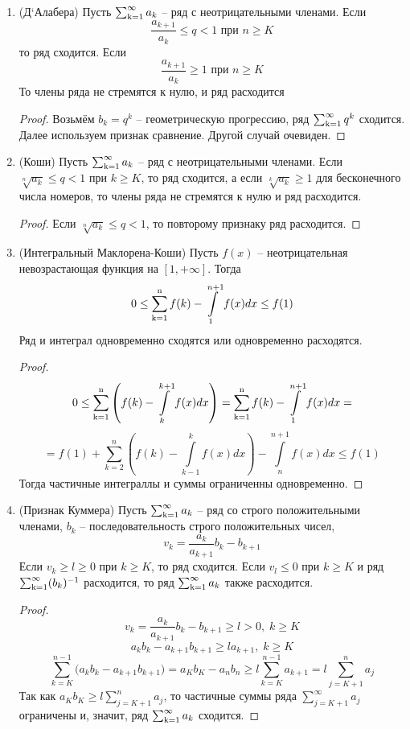 \begin{enumerate}
\begin{proof}
Значит, $a_n \le \frac{a_K}{b_K}b_n, n>K$, поэтому из сходимости ряда $\ssum b_k$ следует сходимость ряда $\ssum a_k$
\end{proof}
\item
(Д`Алабера) Пусть $\ssum a_k$ -- ряд с неотрицательными членами. Если
$$\frac{a_{k+1}}{a_k} \le q < 1 \text{ при } n\ge K$$
то ряд сходится. Если
$$ \frac{a_{k+1}}{a_k} \ge 1 \text{ при } n \ge K$$
То члены ряда не стремятся к нулю, и ряд расходится
\begin{proof}
Возьмём $b_k = q^k$ -- геометрическую прогрессию, ряд $\operatorname{\sum_{k=1}^{\infty}} q^k$ сходится.
Далее используем признак сравнение. Другой случай очевиден.
\end{proof}
\item
(Коши) Пусть $\ssum a_k$ -- ряд с неотрицательными членами. Если $ \sqrt[n]{a_k}\le q < 1$ при $k \ge K $,
то ряд сходится, а если $ \sqrt[k]{a_k}\ge 1$ для бесконечного числа номеров, то члены ряда не стремятся к нулю и ряд расходится.
\begin{proof}
Если  $\sqrt[n]{a_k}\le q < 1$, то повторому признаку ряд расходится. 
\end{proof}
\item
(Интегральный Маклорена-Коши) Пусть $f(x)$ -- неотрицательная невозрастающая функция на $ [1,+\infty] $. Тогда
$$ 0 \le \operatorname{\sum_{k=1}^{n}} f(k) - \int\limits_1^{n+1}f(x)dx\le f(1)$$
Ряд и интеграл одновременно сходятся или одновременно расходятся.
\begin{proof}
$$ 0\le \operatorname{\sum_{k=1}^{n}} \left( f(k) - \int\limits_k^{k+1}f(x)dx \right) = \operatorname{\sum_{k=1}^{n}} f(k) - \int\limits_1^{n+1}f(x)dx = $$
$$ = f(1)+\sum_{k=2}^n \left( f(k) - \int\limits_{k-1}^k f(x)dx \right) - \int\limits_n^{n+1} f(x)dx \le f(1)$$
Тогда частичные интеграллы и суммы ограниченны одновременно.
\end{proof}
\item
(Признак Куммера) Пусть $\ssum a_k$ -- ряд со строго положительными членами,
$b_k$ -- последовательность строго положительных чисел,
$$ v_k = \frac{a_k}{a_{k+1}}b_k - b_{k+1}$$
Если $v_k \ge l \ge 0$ при $k \ge K$, то ряд сходится. Если $v_l \le 0$ при $k \ge K$ и ряд $\operatorname{\sum_{k=1}^{\infty}} (b_k)^{-1}$ расходится, то ряд $\ssum a_k$ также расходится.
\begin{proof}
$$v_k = \frac{a_k}{a_{k+1}} b_k - b_{k+1} \ge l	> 0,\; k \ge K$$
$$a_k b_k-a_{k+1}b_{k+1} \ge l a_{k+1},\; k\ge K$$
$$\sum_{k=K}^{n-1} \big( a_k b_k-a_{k+1}b_{k+1} \big) = a_Kb_K - a_nb_n \ge l \sum_{k=K}^{n-1} a_{k+1} = l \sum_{j=K+1}^{n}a_{j}$$
Так как $a_Kb_K \ge l\sum\limits_{j=K+1}^{n}a_j$, то частичные суммы ряда $\sum\limits_{j=K+1}^{\infty}a_j$ ограничены и, значит, ряд $\ssum a_k$ сходится.

\end{proof}
\end{enumerate}
